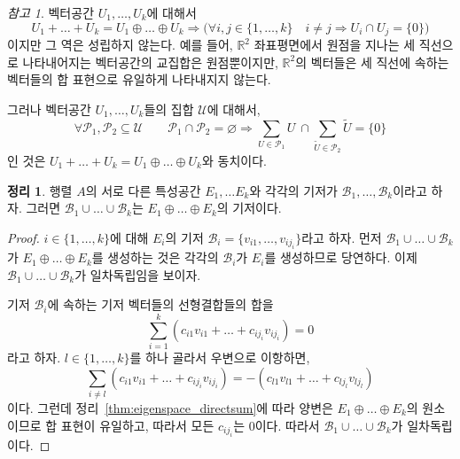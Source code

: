 \documentclass[unfonts,oneside,a4paper]{oblivoir}
\theoremstyle{definition}
\theoremstyle{theorem}
\newtheorem{theorem}[definition]{정리}
\theoremstyle{theorem}
\theoremstyle{remark}
\newtheorem*{remark}{참고}
\theoremstyle{remark}
\theoremstyle{remark}
\theoremstyle{remark}
\renewcommand{\vec}[1]{\bm{\mathit{#1}}}
\newcommand{\vecz}{\bm{\mathrm{0}}}
\begin{document}
\begin{remark}
    벡터공간 $U_1, \dots, U_k$에 대해서
    \begin{equation*}
        U_1 + \dots + U_k = U_1 \oplus \dots \oplus U_k \Rightarrow \bigl(\forall i, j \in \{1, \dots, k\}\quad i \neq j \Rightarrow U_i \cap U_j = \{\vecz\}\bigr)
    \end{equation*}
    이지만 그 역은 성립하지 않는다.
    예를 들어, $\mathbb R^2$ 좌표평면에서 원점을 지나는 세 직선으로 나타내어지는 벡터공간의 교집합은 원점뿐이지만, $\mathbb R^2$의 벡터들은 세 직선에 속하는 벡터들의 합 표현으로 유일하게 나타내지지 않는다.

    그러나 벡터공간 $U_1, \dots, U_k$들의 집합 $\mathcal U$에 대해서,
    \begin{equation*}
        \forall \mathcal P_1, \mathcal P_2 \subseteq \mathcal U \qquad \mathcal P_1 \cap \mathcal P_2 = \varnothing \Rightarrow \sum_{U \in \mathcal P_1} U\ \cap \sum_{\tilde U \in \mathcal P_2} \tilde U = \{\vecz\}
    \end{equation*}
    인 것은 $U_1 + \dots + U_k = U_1 \oplus \dots \oplus U_k$와 동치이다.
\end{remark}

\begin{theorem}
    행렬 $A$의 서로 다른 특성공간 $E_1, \dots E_k$와 각각의 기저가 $\mathcal B_1, \dots, \mathcal B_k$이라고 하자.
    그러면 $\mathcal B_1 \cup \dots \cup \mathcal B_k$는 $E_1 \oplus \dots \oplus E_k$의 기저이다.
\end{theorem}

\begin{proof}
    $i \in \{1, \dots, k\}$에 대해 $E_i$의 기저 $\mathcal B_i = \{\vec v_{i1}, \dots, \vec v_{ij_i}\}$라고 하자.
    먼저 $\mathcal B_1 \cup \dots \cup \mathcal B_k$가 $E_1 \oplus \dots \oplus E_k$를 생성하는 것은 각각의 $\mathcal B_i$가 $E_i$를 생성하므로 당연하다.
    이제 $\mathcal B_1 \cup \dots \cup \mathcal B_k$가 일차독립임을 보이자.

    기저 $\mathcal B_i$에 속하는 기저 벡터들의 선형결합들의 합을
    \begin{equation*}
        \sum_{i = 1}^k (c_{i1} \vec v_{i1} + \dots + c_{ij_i} \vec v_{ij_i}) = \vecz
    \end{equation*}
    라고 하자.
    $l \in \{1, \dots, k\}$를 하나 골라서 우변으로 이항하면,
    \begin{equation*}
        \sum_{i \neq l} (c_{i1} \vec v_{i1} + \dots + c_{ij_i} \vec v_{ij_i}) = -(c_{l1} \vec v_{l1} + \dots + c_{lj_l} \vec v_{lj_l})
    \end{equation*}
    이다.
    그런데 정리~\ref{thm:eigenspace_directsum}에 따라 양변은 $E_1 \oplus \dots \oplus E_k$의 원소이므로 합 표현이 유일하고, 따라서 모든 $c_{ij_i}$는 0이다.
    따라서 $\mathcal B_1 \cup \dots \cup \mathcal B_k$가 일차독립이다.
\end{proof}
\end{document}
